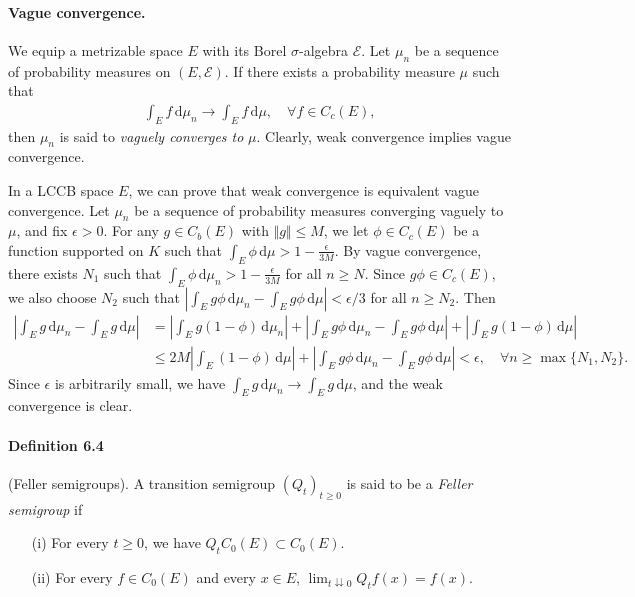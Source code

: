 \documentclass{article}
\numberwithin{equation}{section}
\renewcommand{\d}{\mathrm{d}}
\theoremstyle{plain}
\theoremstyle{definition}
\begin{document}
\paragraph{Vague convergence.} We equip a metrizable space $E$ with its Borel $\sigma$-algebra $\mathscr{E}$. Let $\mu_n$ be a sequence of probability measures on $(E,\mathscr{E})$. If there exists a probability measure $\mu$ such that
\begin{align*}
	\int_E f\,\d \mu_n\to\int_E f\,\d \mu,\quad\forall f\in C_c(E),
\end{align*}
then $\mu_n$ is said to \textit{vaguely converges to} $\mu$. Clearly, weak convergence implies vague convergence.

In a LCCB space $E$, we can prove that weak convergence is equivalent vague convergence. Let $\mu_n$ be a sequence of probability measures converging vaguely to $\mu$, and fix $\epsilon>0$. For any $g\in C_b(E)$ with $\Vert g\Vert\leq M$, we let $\phi\in C_c(E)$ be a function supported on $K$ such that $\int_E\phi\,\d \mu>1-\frac{\epsilon}{3M}$. By vague convergence, there exists $N_1$ such that $\int_E\phi\,\d \mu_n>1-\frac{\epsilon}{3M}$ for all $n\geq N$. Since $g\phi\in C_c(E)$, we also choose $N_2$ such that $\left\vert\int_E g\phi\,\d \mu_n - \int_E g\phi\,\d \mu\right\vert<\epsilon/3$ for all $n\geq N_2$. Then
\begin{align*}
	\left\vert\int_E g\,\d \mu_n - \int_E g\,\d \mu\right\vert &= \left\vert\int_E g(1-\phi)\,\d \mu_n\right\vert + \left\vert\int_E g\phi\,\d \mu_n - \int_E g\phi\,\d \mu\right\vert + \left\vert\int_E g(1-\phi)\,\d \mu\right\vert\\
	&\leq 2M\left\vert\int_E(1-\phi)\,\d \mu\right\vert + \left\vert\int_E g\phi\,\d \mu_n - \int_E g\phi\,\d \mu\right\vert <\epsilon,\quad\forall n\geq\max\{N_1,N_2\}.
\end{align*}
Since $\epsilon$ is arbitrarily small, we have $\int_E g\,\d \mu_n\to\int_E g\,\d \mu$, and the weak convergence is clear.

\paragraph{}

\paragraph{Definition 6.4\label{def:6.4}} (Feller semigroups). A transition semigroup $(Q_t)_{t\geq 0}$ is said to be a \textit{Feller semigroup} if
\begin{itemize}
	\item[(i)] For every $t\geq 0$, we have $Q_tC_0(E)\subset C_0(E)$.
	\item[(ii)] For every $f\in C_0(E)$ and every $x\in E$, $\lim_{t\downdownarrows 0}Q_tf(x)= f(x)$.
\end{itemize}
\end{document}
